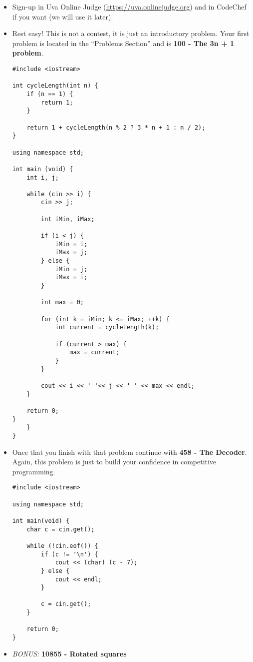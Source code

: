 \documentclass[12pt]{article}
\begin{document}
\begin{itemize}
    \item Sign-up in Uva Online Judge (\url{https://uva.onlinejudge.org}) and in CodeChef if you want (we will use it later).
    \item Rest easy! This is not a contest, it is just an introductory problem. Your first problem is located in the ``Problems Section'' and is \textbf{100 - The 3n + 1 problem}.
    
    \begin{lstlisting}
#include <iostream>

int cycleLength(int n) {
	if (n == 1) {
		return 1;
	}
	
	return 1 + cycleLength(n % 2 ? 3 * n + 1 : n / 2);
}

using namespace std;
	
int main (void) {
	int i, j;

	while (cin >> i) {
		cin >> j;
		
		int iMin, iMax;
		
		if (i < j) {
			iMin = i;
			iMax = j;
		} else {
			iMin = j;
			iMax = i;
		}

		int max = 0;

		for (int k = iMin; k <= iMax; ++k) {
			int current = cycleLength(k);

			if (current > max) {
				max = current;
			}
		}

		cout << i << ' '<< j << ' ' << max << endl;
	}

	return 0;
}
    }
}

\end{lstlisting}
    
    \item Once that you finish with that problem continue with \textbf{458 - The Decoder}. Again, this problem is just to build your confidence in competitive programming.
    
    \begin{lstlisting}
#include <iostream>

using namespace std;

int main(void) {
	char c = cin.get();

	while (!cin.eof()) {
		if (c != '\n') {
			cout << (char) (c - 7);
		} else {
			cout << endl;
		}

		c = cin.get();
	}

	return 0;
}

\end{lstlisting}
    
    \item \emph{BONUS:} \textbf{10855 - Rotated squares}
    
\end{itemize}
\end{document}
